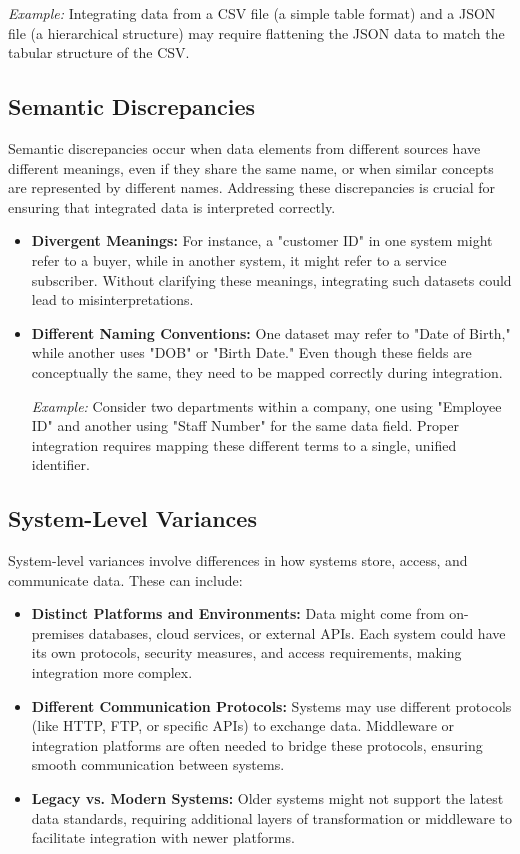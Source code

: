 \documentclass[12pt]{article}
\begin{document}
\textit{Example:} Integrating data from a CSV file (a simple table format) and a JSON file (a hierarchical structure) may require flattening the JSON data to match the tabular structure of the CSV.

\subsection{Semantic Discrepancies}
Semantic discrepancies occur when data elements from different sources have different meanings, even if they share the same name, or when similar concepts are represented by different names. Addressing these discrepancies is crucial for ensuring that integrated data is interpreted correctly.

\begin{itemize}
    \item \textbf{Divergent Meanings:} For instance, a "customer ID" in one system might refer to a buyer, while in another system, it might refer to a service subscriber. Without clarifying these meanings, integrating such datasets could lead to misinterpretations.
    
    \item \textbf{Different Naming Conventions:} One dataset may refer to "Date of Birth," while another uses "DOB" or "Birth Date." Even though these fields are conceptually the same, they need to be mapped correctly during integration.
    
\textit{Example:} Consider two departments within a company, one using "Employee ID" and another using "Staff Number" for the same data field. Proper integration requires mapping these different terms to a single, unified identifier.
\end{itemize}

\subsection{System-Level Variances}
System-level variances involve differences in how systems store, access, and communicate data. These can include:

\begin{itemize}
\item \textbf{Distinct Platforms and Environments:} Data might come from on-premises databases, cloud services, or external APIs. Each system could have its own protocols, security measures, and access requirements, making integration more complex.

\item \textbf{Different Communication Protocols:} Systems may use different protocols (like HTTP, FTP, or specific APIs) to exchange data. Middleware or integration platforms are often needed to bridge these protocols, ensuring smooth communication between systems.

\item \textbf{Legacy vs. Modern Systems:} Older systems might not support the latest data standards, requiring additional layers of transformation or middleware to facilitate integration with newer platforms.
\end{itemize}
\end{document}
